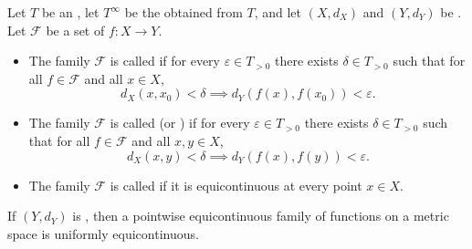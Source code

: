 \begin{definition} \label{definition:equicontinuous_family_of_functions_between_metric_spaces}
    Let $T$ be an , let $T^\infty$ be the  obtained from $T$, and let $(X, d_X)$ and $(Y, d_Y)$ be . Let $\mathcal{F}$ be a set of  $f : X \to Y$.

    \begin{itemize}
        \item The family $\mathcal{F}$ is called  if for every $\varepsilon \in T_{>0}$ there exists $\delta \in T_{>0}$ such that for all $f \in \mathcal{F}$ and all $x \in X$,
        $$d_X(x, x_0) < \delta \implies d_Y(f(x), f(x_0)) < \varepsilon.$$

        \item The family $\mathcal{F}$ is called  (or ) if for every $\varepsilon \in T_{>0}$ there exists $\delta \in T_{>0}$ such that for all $f \in \mathcal{F}$ and all $x, y \in X$,
        $$d_X(x, y) < \delta \implies d_Y(f(x), f(y)) < \varepsilon.$$

        \item The family $\mathcal{F}$ is called  if it is equicontinuous at every point $x \in X$.
    \end{itemize}

    If $(Y, d_Y)$ is , then a pointwise equicontinuous family of functions on a  metric space is uniformly equicontinuous.
\end{definition}